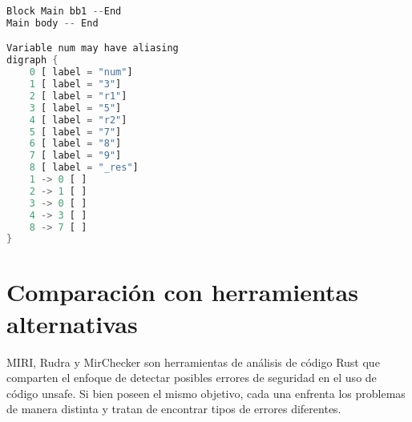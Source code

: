 \begin{minipage}[c][10cm][c]{0,5\textwidth}
\begin{lstlisting}[language=Rust]
Block Main bb1 --End
Main body -- End

Variable num may have aliasing
digraph {
    0 [ label = "num"]
    1 [ label = "3"]
    2 [ label = "r1"]
    3 [ label = "5"]
    4 [ label = "r2"]
    5 [ label = "7"]
    6 [ label = "8"]
    7 [ label = "9"]
    8 [ label = "_res"]
    1 -> 0 [ ]
    2 -> 1 [ ]
    3 -> 0 [ ]
    4 -> 3 [ ]
    8 -> 7 [ ]
}
\end{lstlisting}
\end{minipage}
\begin{minipage}[c][9cm][t]{0,5\textwidth}
\begin{center}
\end{center}
\end{minipage}

\section{Comparación con herramientas alternativas}

MIRI, Rudra y MirChecker son herramientas de análisis de código Rust que comparten el enfoque de detectar posibles errores de seguridad en el uso de código unsafe. Si bien poseen el mismo objetivo, cada una enfrenta los problemas de  manera distinta y tratan de encontrar tipos de errores diferentes.

